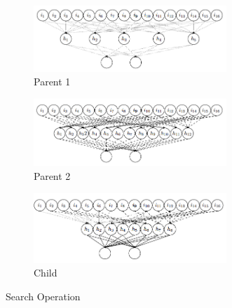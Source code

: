 \begin{figure}[h!]
	\centering
	\begin{subfigure}[b]{1.0\linewidth}
		\centering
		\includegraphics[width=0.8\textwidth]{./a0_figure_ann_for_clt_architecture_example1.png}
		\caption{Parent 1}
		\label{fig:p1}
	\end{subfigure}
	\newline
	\begin{subfigure}[b]{1.0\linewidth}
		\centering
		\includegraphics[width=0.8\textwidth]{./a0_figure_ann_for_clt_architecture_example2.png}
		\caption{Parent 2}
		\label{fig:p2}
	\end{subfigure}
	\newline
	\begin{subfigure}[b]{1.0\linewidth}
		\centering
		\includegraphics[width=0.8\textwidth]{./a0_figure_ann_for_clt_architecture_child.png}
		\caption{Child}
		\label{fig:child}
	\end{subfigure}
	\caption{Search Operation}
	\label{fig:search}
\end{figure}
